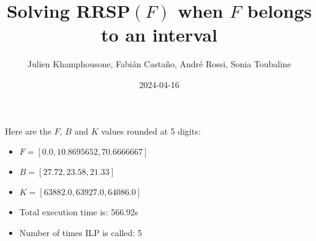 \documentclass{article}
\begin{document}
     \title{Solving RRSP$(F)$ when $F$ belongs to an interval}
     \author{Julien Khamphousone, Fabi\'an Casta\~no, Andr\'e Rossi, Sonia Toubaline}
     \date{2024-04-16}
     \maketitle
     \def\F{{0.0,0.1086957,0.7066667,0.7773333}}
\def\gF{{638.82,641.8330435,655.9332,64101.0732}}

    Here are the $F$, $B$ and $K$ values rounded at 5 digits:

\begin{itemize}
	\item  $F = [0.0,10.8695652,70.6666667]$
 \item $B = [27.72,23.58,21.33]$
 \item  $K = [63882.0,63927.0,64086.0]$\item Total execution time is: 566.92s\item Number of times ILP is called: 5\end{itemize}
\end{document}
